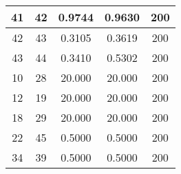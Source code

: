{\begin{tabular}{|c|c|c|c|c|}
    41 & 42 & 0.9744 & 0.9630 & 200\\ \hline
    42 & 43 & 0.3105 & 0.3619 & 200\\ \hline
    43 & 44 & 0.3410 & 0.5302 & 200\\ \hline
    10 & 28 & 20.000 & 20.000 & 200\\ \hline
    12 & 19 & 20.000 & 20.000 & 200\\ \hline
    18 & 29 & 20.000 & 20.000 & 200\\ \hline
    22 & 45 & 0.5000 & 0.5000 & 200\\ \hline
    34 & 39 & 0.5000 & 0.5000 & 200\\ \hline
    
\end{tabular}
}